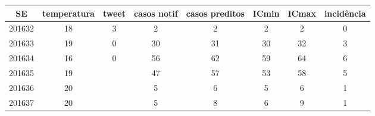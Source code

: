 \begin{tabular}{c|ccccccc}
  \hline
SE & temperatura & tweet & casos notif & casos preditos & ICmin & ICmax & incidência \\ 
  \hline
201632 & 18 & 3 & 2 & 2 & 2 & 2 & 0 \\ 
  201633 & 19 & 0 & 30 & 31 & 30 & 32 & 3 \\ 
  201634 & 16 & 0 & 56 & 62 & 59 & 64 & 6 \\ 
  201635 & 19 &  & 47 & 57 & 53 & 58 & 5 \\ 
  201636 & 20 &  & 5 & 6 & 5 & 6 & 1 \\ 
  201637 & 20 &  & 5 & 8 & 6 & 9 & 1 \\ 
   \hline
\end{tabular}
